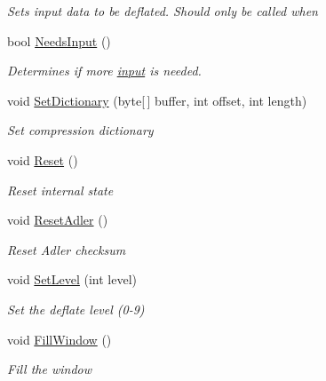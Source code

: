 \begin{DoxyCompactItemize}
\begin{DoxyCompactList}\small\item\em Sets input data to be deflated. Should only be called when \end{DoxyCompactList}\item 
bool \hyperlink{class_i_c_sharp_code_1_1_sharp_zip_lib_1_1_zip_1_1_compression_1_1_deflater_engine_a475e9858378cc276c87dd412ba377e2d}{Needs\+Input} ()
\begin{DoxyCompactList}\small\item\em Determines if more \hyperlink{class_i_c_sharp_code_1_1_sharp_zip_lib_1_1_zip_1_1_compression_1_1_deflater_engine_ab1fe3a452efc5e02b8ef7ff799d68fdf}{input} is needed. \end{DoxyCompactList}\item 
void \hyperlink{class_i_c_sharp_code_1_1_sharp_zip_lib_1_1_zip_1_1_compression_1_1_deflater_engine_aeac659aa6215db8d4d3d862a22ed4450}{Set\+Dictionary} (byte\mbox{[}$\,$\mbox{]} buffer, int offset, int length)
\begin{DoxyCompactList}\small\item\em Set compression dictionary \end{DoxyCompactList}\item 
void \hyperlink{class_i_c_sharp_code_1_1_sharp_zip_lib_1_1_zip_1_1_compression_1_1_deflater_engine_a6a660bc5902d906ff1b46ec497b2aac3}{Reset} ()
\begin{DoxyCompactList}\small\item\em Reset internal state \end{DoxyCompactList}\item 
void \hyperlink{class_i_c_sharp_code_1_1_sharp_zip_lib_1_1_zip_1_1_compression_1_1_deflater_engine_a46504a258a9d80e4f1854525569d954b}{Reset\+Adler} ()
\begin{DoxyCompactList}\small\item\em Reset Adler checksum \end{DoxyCompactList}\item 
void \hyperlink{class_i_c_sharp_code_1_1_sharp_zip_lib_1_1_zip_1_1_compression_1_1_deflater_engine_a957ec62f92fd20c1cbd9e2fb007a2334}{Set\+Level} (int level)
\begin{DoxyCompactList}\small\item\em Set the deflate level (0-\/9) \end{DoxyCompactList}\item 
void \hyperlink{class_i_c_sharp_code_1_1_sharp_zip_lib_1_1_zip_1_1_compression_1_1_deflater_engine_afc2a7ef56411f0d02e2d242ffa205319}{Fill\+Window} ()
\begin{DoxyCompactList}\small\item\em Fill the window \end{DoxyCompactList}\end{DoxyCompactItemize}
